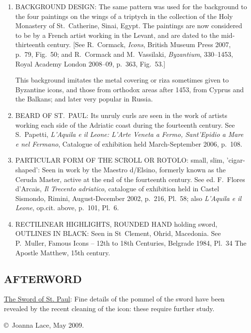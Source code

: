 \documentclass[a4paper,12pt]{article}
\begin{document}
\begin{enumerate}
\item BACKGROUND DESIGN: The same pattern was used for the background
  to the four paintings on the wings of a triptych in the collection
  of the Holy Monastery of St.~Catherine, Sinai, Egypt.  The paintings
  are now considered to be by a French artist working in the Levant,
  and are dated to the mid-thirteenth century. [See R.~Cormack,
    \textit{Icons}, British Museum Press 2007, p.~79, Fig.~50; and R.~Cormack
    and M.~Vassilaki, \textit{Byzantium}, 330--1453, Royal Academy London
    2008--09, p.~363, Fig.~53.]

This background imitates the metal covering or riza sometimes given to
Byzantine icons, and those from orthodox areas after 1453, from Cyprus
and the Balkans; and later very popular in Russia.

\item BEARD OF ST.~PAUL: Its unruly curls are seen in the work of
  artists working each side of the Adriatic coast during the
  fourteenth century.  See S.~Papetti, \textit{L'Aquila e il Leone: L'Arte
  Veneta a Fermo, Sant'Epidio a Mare e nel Fermano}, Catalogue of
  exhibition held March-September 2006, p.~108.

\item PARTICULAR FORM OF THE SCROLL OR ROTOLO: small, slim,
  'cigar-shaped': Seen in work by the Maestro d/Elsino, formerly known
  as the Ceruda Master, active at the end of the fourteenth century.
  See ed. F.~Flores d'Arcais, \textit{Il Trecento adriatico}, catalogue of
  exhibition held in Castel Sismondo, Rimini, August-December 2002,
  p.~216, Pl.~58; also \textit{L'Aquila e il Leone}, op.cit. above, p.~101,
  Pl.~6.

\item 
RECTILINEAR HIGHLIGHTS, ROUNDED HAND holding sword, OUTLINES IN BLACK:
Seen in St~Clement, Ohrid, Macedonia. See P.~Muller, Famous Icons –
12th to 18th Centuries, Belgrade 1984, Pl.~34 The Apostle Matthew, 15th
century.

\end{enumerate}


\subsection*{AFTERWORD}

\underline{The Sword of St. Paul}: Fine details of the pommel of the
sword have been revealed by the recent cleaning of the icon: these
require further study.

\bigskip
\noindent
\copyright\ Joanna Lace, May 2009.
\end{document}

